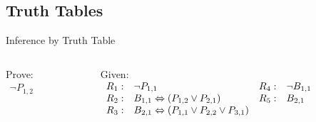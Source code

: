\documentclass[14pt]{beamer}
\begin{document}
\subsection{Truth Tables}
\begin{frame}{Inference by Truth Table}
	\small
	\begin{columns}[T]
		\begin{column}{.8in}
			Prove: \\[.2em]
			$
			\begin{array}{l}
				\lnot P_{1,2}
			\end{array}
			$
		\end{column}
		\begin{column}{3.4in}
			Given: \\[.2em]
			\small
			$
			\begin{array}{llll}
			R_1: & \lnot P_{1,1}                                     & R_4: & \lnot B_{1,1} \\
			R_2: & B_{1,1} \Leftrightarrow (P_{1,2} \lor P_{2,1})              & R_5: & B_{2,1}\\
			R_3: & B_{2,1} \Leftrightarrow (P_{1,1} \lor P_{2,2} \lor P_{3,1})
			\end{array}
			$
		\end{column}
	\end{columns}
	\pause
	

\end{frame}
\end{document}
